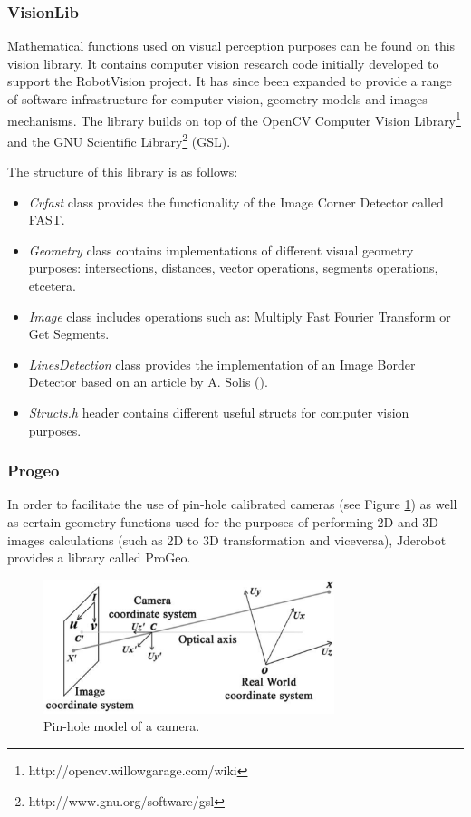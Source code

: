 \documentclass[twocolumn]{svjour3}          %
\begin{document}
\subsubsection{VisionLib}
\label{subsec:visionlib}

Mathematical functions used on visual perception purposes can be found on this vision library. It contains computer vision research code initially developed to support the RobotVision project. It has since been expanded to provide a range of software infrastructure for computer vision, geometry models and images mechanisms. The library builds on top of the OpenCV Computer Vision Library\footnote{http://opencv.willowgarage.com/wiki} and the GNU Scientific Library\footnote{http://www.gnu.org/software/gsl} (GSL).

The structure of this library is as follows:
\begin{itemize} 
\item \textit{Cvfast} class provides the functionality of the Image Corner Detector called FAST.
\item \textit{Geometry} class contains implementations of different visual geometry purposes: intersections, distances, vector operations, segments operations, etcetera.
\item \textit{Image} class includes operations such as: Multiply Fast Fourier Transform or Get Segments.
\item \textit{LinesDetection} class provides the implementation of an Image Border Detector based on an article by A. Solis (\cite{solis09}).
\item \textit{Structs.h} header contains different useful structs for computer vision purposes.
\end{itemize}

\subsubsection{Progeo}
\label{subsec:progeo}

In order to facilitate the use of pin-hole calibrated cameras (see Figure \ref{fig:pinholemodel}) as well as certain geometry functions used for the purposes of performing 2D and 3D images calculations (such as 2D to 3D transformation and viceversa), Jderobot provides a library called ProGeo.

\begin{figure}[h!]
  \includegraphics[width=8.5cm]{figs/pinholemodel.png}
\caption{Pin-hole model of a camera.}
\label{fig:pinholemodel}
\end{figure}
\end{document}
